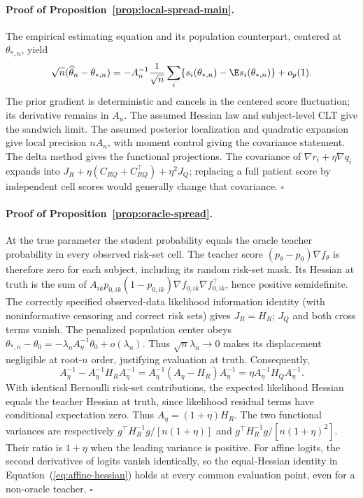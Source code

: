\documentclass{article} %
\renewcommand{\eqref}[1]{\textup{(\ref{#1})}}
\begin{document}
\paragraph{Proof of Proposition~\ref{prop:local-spread-main}.}
The empirical estimating equation and its population counterpart, centered at $\theta_{*,n}$, yield
\[
\sqrt n(\widehat\theta_n-\theta_{*,n})
=-A_n^{-1}\frac1{\sqrt n}\sum_i\{s_i(\theta_{*,n})-\E s_i(\theta_{*,n})\}+o_p(1).
\]
The prior gradient is deterministic and cancels in the centered score fluctuation; its derivative remains in $A_n$. The assumed Hessian law and subject-level CLT give the sandwich limit. The assumed posterior localization and quadratic expansion give local precision $nA_n$, with moment control giving the covariance statement. The delta method gives the functional projections. The covariance of $\nabla r_i+\eta\nabla q_i$ expands into $J_R+\eta(C_{RQ}+C_{RQ}^\top)+\eta^2J_Q$; replacing a full patient score by independent cell scores would generally change that covariance. \hfill$\square$

\paragraph{Proof of Proposition~\ref{prop:oracle-spread}.}
At the true parameter the student probability equals the oracle teacher probability in every observed risk-set cell. The teacher score $(p_\theta-p_0)\nabla f_\theta$ is therefore zero for each subject, including its random risk-set mask. Its Hessian at truth is the sum of $A_{ik}p_{0,ik}(1-p_{0,ik})\nabla f_{0,ik}\nabla f_{0,ik}^\top$, hence positive semidefinite. The correctly specified observed-data likelihood information identity (with noninformative censoring and correct risk sets) gives $J_R=H_R$; $J_Q$ and both cross terms vanish. The penalized population center obeys $\theta_{*,n}-\theta_0=-\lambda_n A_\eta^{-1}\theta_0+o(\lambda_n)$. Thus $\sqrt n\lambda_n\to0$ makes its displacement negligible at root-$n$ order, justifying evaluation at truth. Consequently,
\[
A_\eta^{-1}-A_\eta^{-1}H_RA_\eta^{-1}
=A_\eta^{-1}(A_\eta-H_R)A_\eta^{-1}
=\eta A_\eta^{-1}H_QA_\eta^{-1}.
\]
With identical Bernoulli risk-set contributions, the expected likelihood Hessian equals the teacher Hessian at truth, since likelihood residual terms have conditional expectation zero. Thus $A_\eta=(1+\eta)H_R$. The two functional variances are respectively $g^\top H_R^{-1}g/[n(1+\eta)]$ and $g^\top H_R^{-1}g/[n(1+\eta)^2]$. Their ratio is $1+\eta$ when the leading variance is positive. For affine logits, the second derivatives of logits vanish identically, so the equal-Hessian identity in Equation~\eqref{eq:affine-hessian} holds at every common evaluation point, even for a non-oracle teacher. \hfill$\square$
\end{document}
